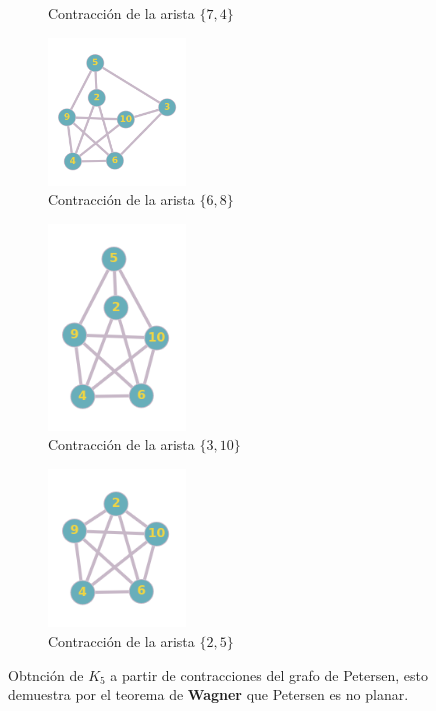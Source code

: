 \documentclass[a4paper,1pt]{report}
\begin{document}
\begin{figure}[H]
\begin{subfigure}[b]{0.45\textwidth}
        \caption{Contracción de la arista $\{7,4\}$}
    \end{subfigure}
    \begin{subfigure}[b]{0.45\textwidth}
        \centering
        \includegraphics[width=0.4\textwidth]{figures5/Petersenk54.png}
        \caption{Contracción de la arista $\{6,8\}$}
    \end{subfigure}
    \begin{subfigure}[b]{0.45\textwidth}
        \centering
        \includegraphics[width=0.4\textwidth]{figures5/Petersenk55.png}
        \caption{Contracción de la arista $\{3,10\}$}
    \end{subfigure}
    \begin{subfigure}[b]{0.45\textwidth}
        \centering
        \includegraphics[width=0.4\textwidth]{figures5/Petersenk56.png}
        \caption{Contracción de la arista $\{2,5\}$}
    \end{subfigure}
    \caption{Obtnci\'on de $K_5$ a partir de contracciones del grafo de Petersen, esto demuestra por el teorema de \textbf{Wagner} que Petersen es no planar.}
\end{figure} 
\end{document}
